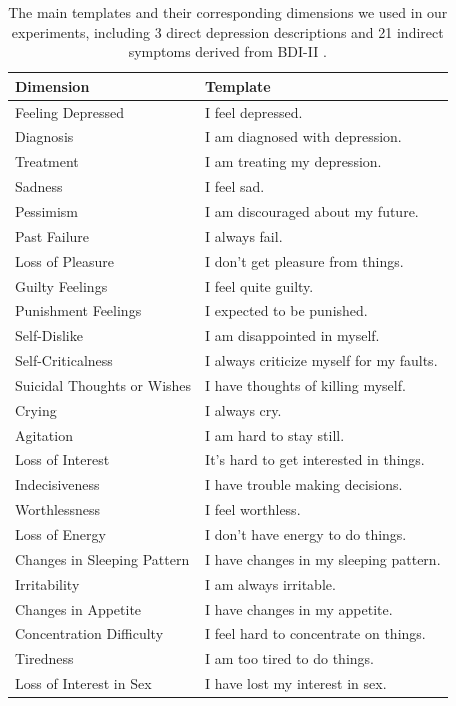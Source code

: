 \begin{table}[t]
    \small
    \centering
    \begin{tabular}{l|l}
    \hline
    Dimension & Template \\
    \hline
    Feeling Depressed  &  I feel depressed. \\
    Diagnosis &  I am diagnosed with depression. \\
    Treatment &  I am treating my depression. \\
    \hline
    Sadness & I feel sad.  \\
    Pessimism & I am discouraged about my future.  \\
    Past Failure & I always fail. \\
    Loss of Pleasure & I don't get pleasure from things. \\
    Guilty Feelings & I feel quite guilty. \\
    Punishment Feelings & I expected to be punished. \\
    Self-Dislike & I am disappointed in myself. \\
    Self-Criticalness & I always criticize myself for my faults. \\
    Suicidal Thoughts or Wishes & I have thoughts of killing myself. \\
    Crying & I always cry. \\
    Agitation & I am hard to stay still. \\
    Loss of Interest & It's hard to get interested in things. \\
    Indecisiveness & I have trouble making decisions. \\
    Worthlessness & I feel worthless. \\
    Loss of Energy & I don't have energy to do things. \\
    Changes in Sleeping Pattern & I have changes in my sleeping pattern. \\
    Irritability & I am always irritable. \\
    Changes in Appetite & I have changes in my appetite. \\
    Concentration Difficulty & I feel hard to concentrate on things. \\
    Tiredness  & I am too tired to do things. \\
    Loss of Interest in Sex & I have lost my interest in sex. \\
    \hline
    \end{tabular}
    \caption{The main templates and their corresponding dimensions we used in our experiments, including 3 direct depression descriptions and 21 indirect symptoms derived from BDI-II \citep{beck1996beck}. }
    \label{table:bdi}
  \end{table}

